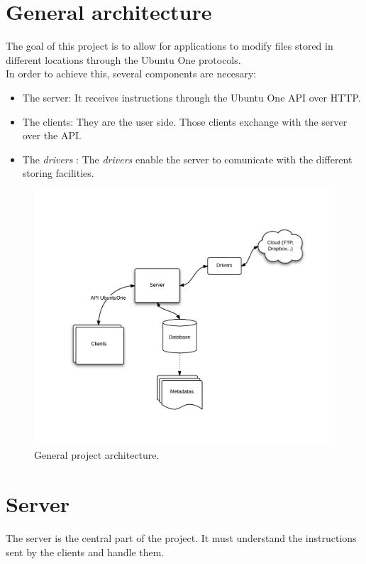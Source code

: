 \section{General architecture}
The goal of this project is to allow for applications to modify files stored in different locations through the Ubuntu One protocols.\\

In order to achieve this, several components are necesary:
\begin{itemize}
\renewcommand{\labelitemi}{$\bullet$}
   \item The server: It receives instructions through the Ubuntu One API over HTTP.
   \item The clients: They are the user side. Those clients exchange with the server over the API.
   \item The \textit{drivers} : The \textit{drivers} enable the server to comunicate with the different storing facilities.
\end{itemize}

\begin{figure}
    \center
    \includegraphics[width=500pt]{architecture.png}
    \caption{General project architecture.}
\end{figure}

\section{Server}
The server is the central part of the project. It must understand the instructions sent by the clients and handle them.\\


